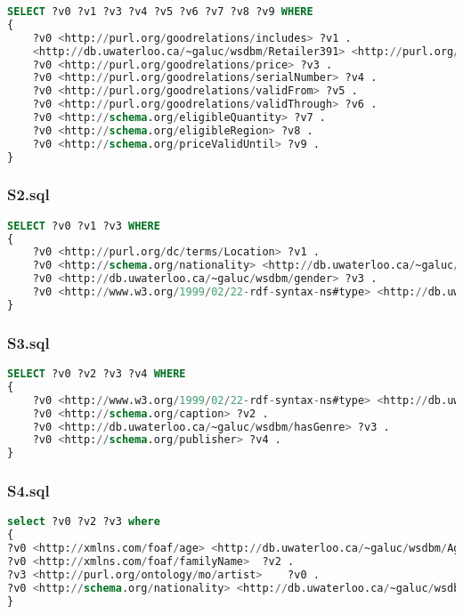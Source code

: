 \documentclass[titlepage, a4paper, 12pt] {article}
\begin{document}
\begin{lstlisting}[language=SQL]
SELECT ?v0 ?v1 ?v3 ?v4 ?v5 ?v6 ?v7 ?v8 ?v9 WHERE 
{
	?v0 <http://purl.org/goodrelations/includes> ?v1 .
	<http://db.uwaterloo.ca/~galuc/wsdbm/Retailer391> <http://purl.org/goodrelations/offers> ?v0 .
	?v0 <http://purl.org/goodrelations/price> ?v3 .
	?v0 <http://purl.org/goodrelations/serialNumber> ?v4 .
	?v0 <http://purl.org/goodrelations/validFrom> ?v5 .
	?v0 <http://purl.org/goodrelations/validThrough> ?v6 .
	?v0 <http://schema.org/eligibleQuantity> ?v7 .
	?v0 <http://schema.org/eligibleRegion> ?v8 .
	?v0 <http://schema.org/priceValidUntil> ?v9 .
}
\end{lstlisting}

\subsubsection{S2.sql}

\begin{lstlisting}[language=SQL]
SELECT ?v0 ?v1 ?v3 WHERE 
{
	?v0 <http://purl.org/dc/terms/Location> ?v1 .
	?v0 <http://schema.org/nationality> <http://db.uwaterloo.ca/~galuc/wsdbm/Country23> .
	?v0 <http://db.uwaterloo.ca/~galuc/wsdbm/gender> ?v3 .
	?v0 <http://www.w3.org/1999/02/22-rdf-syntax-ns#type> <http://db.uwaterloo.ca/~galuc/wsdbm/Role2> .
}
\end{lstlisting}

\subsubsection{S3.sql}

\begin{lstlisting}[language=SQL]
SELECT ?v0 ?v2 ?v3 ?v4 WHERE 
{
	?v0 <http://www.w3.org/1999/02/22-rdf-syntax-ns#type> <http://db.uwaterloo.ca/~galuc/wsdbm/ProductCategory12> .
	?v0 <http://schema.org/caption> ?v2 .
	?v0 <http://db.uwaterloo.ca/~galuc/wsdbm/hasGenre> ?v3 .
	?v0 <http://schema.org/publisher> ?v4 .
}
\end{lstlisting}

\subsubsection{S4.sql}

\begin{lstlisting}[language=SQL]
select ?v0 ?v2 ?v3 where 
{
?v0	<http://xmlns.com/foaf/age>	<http://db.uwaterloo.ca/~galuc/wsdbm/AgeGroup1> . 
?v0	<http://xmlns.com/foaf/familyName>	?v2 . 
?v3	<http://purl.org/ontology/mo/artist>	?v0 . 
?v0	<http://schema.org/nationality>	<http://db.uwaterloo.ca/~galuc/wsdbm/Country1> . 
}
\end{lstlisting}
\end{document}
